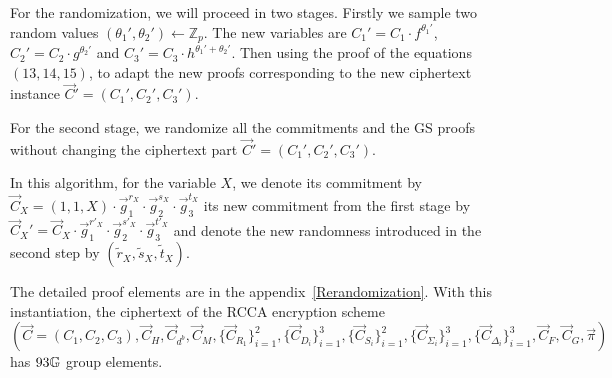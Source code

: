 For the randomization, we will proceed in two stages. Firstly we sample two random values $(\theta_1', \theta_2') \gets \mathbb{Z}_p$. The new variables are $C_1' = C_1 \cdot f^{\theta_1'}$, $C_2' = C_2 \cdot g^{\theta_2'}$ and $C_3' = C_3 \cdot h^{\theta_1'+\theta_2'}$. Then using the proof of the equations $(13, 14, 15)$, to adapt the new proofs corresponding to the new ciphertext instance $\vec{C}' = (C_1', C_2', C_3')$.


For the second stage, we randomize all the commitments and the GS proofs without changing the ciphertext part $\vec{C}' = (C_1', C_2', C_3')$.

In this algorithm, for the variable $X$, we denote its commitment by $\vec{C}_X = (1, 1, X) \cdot \vec{g}_1^{r_X} \cdot \vec{g}_2^{s_X} \cdot \vec{g}_3^{t_X}$ its new commitment from the first stage by $\vec{C}_X' = \vec{C}_X \cdot \vec{g}_1^{r'_X} \cdot \vec{g}_2^{s'_X} \cdot \vec{g}_3^{t'_X}$ and denote the new randomness introduced in the second step by $(\tilde{r}_X, \tilde{s}_X, \tilde{t}_X)$.


The detailed proof elements are in the appendix~\ref{Rerandomization}. With this instantiation, the ciphertext of the RCCA encryption scheme
 $$(\vec{C} = (C_1, C_2, C_3), \vec{C}_{H}, \vec{C}_{d^b}, \vec{C}_{M}, \{\vec{C}_{R_1}\}_{i= 1}^2, \{\vec{C}_{D_i}\}_{i = 1}^3, \{\vec{C}_{S_i}\}_{i = 1}^2, \{\vec{C}_{\Sigma_i}\}_{i = 1}^3,\{\vec{C}_{\Delta_i}\}_{i=1}^3, \vec{C}_F, \vec{C}_G, \vec{\pi})$$
has $93\mathbb{G}$ group elements.
